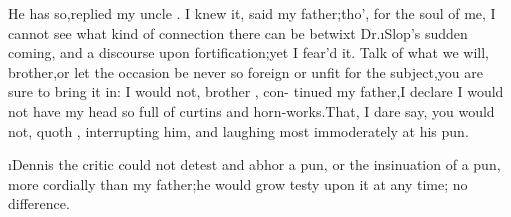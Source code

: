 \documentclass[twoside]{article}
\begin{document}
He has so,\tsk replied my uncle \toby.\tsk\break
I knew it, said my father;\tsk tho’, for the soul of me, I cannot see what kind
of connection there can be betwixt Dr.\@ \i{Slop}’s sudden
coming, and a discourse upon fortification;\tsk yet I
fear’d it.\tsk\break
Talk of what we will, brother,\tsk or let the occasion be
never so foreign or unfit for the subject,\tsk you are sure
to bring it in: I would not, brother \toby, con-
tinued my father,\tsh I declare I would not have my head
so full of curtins and horn-works.\tsh That, I dare say, you
would not, quoth \drslop, interrupting him, and
laughing most immoderately at\break
his pun.

\i{Dennis} the critic could not detest and abhor a pun, or
the insinuation of a pun, more cordially than my father;\tsh he
would grow testy upon it at any time;\tsk\break
{} 
no difference.
\end{document}

